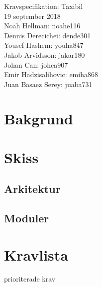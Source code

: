 \documentclass[12pt]{article}
\date{\today}
\begin{document}
\begin{center}
\vspace*{2cm}
{\Huge Kravspecifikation: Taxibil}\\
\vspace{2cm}
{\large 19 september 2018}\\
\vspace{2cm}
Noah Hellman: noahe116 \\
Dennis Derecichei: dende301 \\
Yousef Hashem: youha847 \\
Jakob Arvidsson: jakar180 \\
Johan Can: johca907 \\
Emir Hadzisalihovic: emiha868 \\
Juan Basaez Serey: juaba731
\end{center}

\vspace{2cm}
\tableofcontents
\newpage

\section{Bakgrund}

\section{Skiss}
\subsection{Arkitektur}
\subsection{Moduler}

\section{Kravlista}
prioriterade krav
\end{document}
